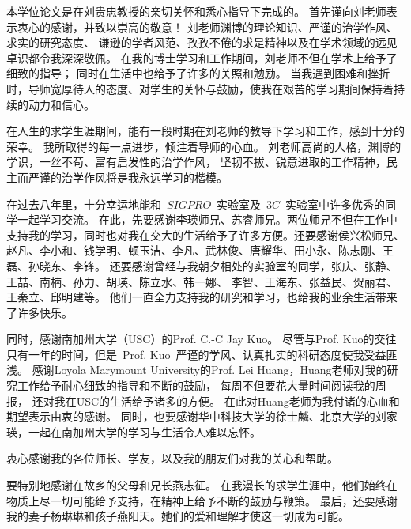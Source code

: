 \par 本学位论文是在刘贵忠教授的亲切关怀和悉心指导下完成的。 首先谨向刘老师表示衷心的感谢，并致以崇高的敬意！
刘老师渊博的理论知识、严谨的治学作风、求实的研究态度、
谦逊的学者风范、孜孜不倦的求是精神以及在学术领域的远见卓识都令我深深敬佩。
在我的博士学习和工作期间，刘老师不但在学术上给予了细致的指导； 同时在生活中也给予了许多的关照和勉励。
当我遇到困难和挫折时，导师宽厚待人的态度、对学生的关怀与鼓励，使我在艰苦的学习期间保持着持续的动力和信心。

在人生的求学生涯期间，能有一段时期在刘老师的教导下学习和工作，感到十分的荣幸。
我所取得的每一点进步，倾注着导师的心血。
刘老师高尚的人格，渊博的学识，一丝不苟、富有启发性的治学作风，
坚韧不拔、锐意进取的工作精神，民主而严谨的治学作风将是我永远学习的楷模。

\par 在过去八年里，十分幸运地能和~$SIGPRO$~实验室及~$3C$~实验室中许多优秀的同学一起学习交流。
在此，先要感谢李瑛师兄、苏睿师兄。两位师兄不但在工作中支持我的学习，同时也对我在交大的生活给予了许多方便。还要感谢侯兴松师兄、赵凡、李小和、钱学明、顿玉洁、李凡、武林俊、唐耀华、田小永、陈志刚、王磊、孙晓东、李锋。
还要感谢曾经与我朝夕相处的实验室的同学，张庆、张静、王喆、南楠、孙力、胡瑛、陈立水、韩一娜、
李智、王海东、张益民、贺丽君、王秦立、邱明建等。
他们一直全力支持我的研究和学习，也给我的业余生活带来了许多快乐。

\par 同时，感谢南加州大学（USC）的Prof. C.-C Jay Kuo。
尽管与Prof. Kuo的交往只有一年的时间，但是~Prof. Kuo~严谨的学风、认真扎实的科研态度使我受益匪浅。
感谢Loyola Marymount University的Prof. Lei Huang，Huang老师对我的研究工作给予耐心细致的指导和不断的鼓励，
每周不但要花大量时间阅读我的周报，
还对我在USC的生活给予诸多的方便。
在此对Huang老师为我付诸的心血和期望表示由衷的感谢。
同时，也要感谢华中科技大学的徐士麟、北京大学的刘家瑛，一起在南加州大学的学习与生活令人难以忘怀。

\par 衷心感谢我的各位师长、学友，以及我的朋友们对我的关心和帮助。 
\par 要特别地感谢在故乡的父母和兄长燕志征。 在我漫长的求学生涯中，他们始终在物质上尽一切可能给予支持，在精神上给予不断的鼓励与鞭策。 最后，还要感谢我的妻子杨琳琳和孩子燕阳天。她们的爱和理解才使这一切成为可能。
